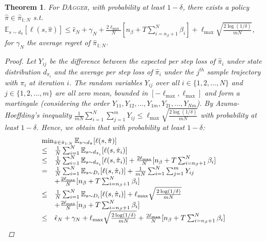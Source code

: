 \documentclass[twoside]{article}
\newtheorem{theorem}{Theorem}[section]
\begin{document}
\begin{theorem}
For \textsc{DAgger}, with probability at least $1-\delta$, there exists a policy $\hat{\pi} \in \hat{\pi}_{1:N}$ s.t. $\mathbb{E}_{s \sim d_{\hat{\pi}}}[ \ell(s,\hat{\pi}) ] \leq \hat{\epsilon}_N + \gamma_N + \frac{2 \ell_{\max}}{N} [n_\beta + T \sum_{i=n_\beta+1}^N \beta_i] + \ell_{\max} \sqrt{\frac{2\log(1/\delta)}{mN}}$, for $\gamma_N$ the average regret of $\hat{\pi}_{1:N}$.
\begin{proof}
Let $Y_{ij}$ be the difference between the expected per step loss of $\hat{\pi}_i$ under state distribution $d_{\pi_i}$ and the average per step loss of $\hat{\pi}_i$ under the $j^{th}$ sample trajectory with $\pi_i$ at iteration $i$. The random variables $Y_{ij}$ over all $i \in \{1,2,\dots,N\}$ and $j \in \{1,2,\dots,m\}$ are all zero mean, bounded in $[-\ell_{\max}, \ell_{\max}]$ and form a martingale (considering the order $Y_{11}, Y_{12}, \dots, Y_{1m}, Y_{21}, \dots, Y_{Nm}$). By Azuma-Hoeffding's inequality $\frac{1}{mN} \sum_{i=1}^N \sum_{j=1}^m Y_{ij} \leq \ell_{\max} \sqrt{\frac{2\log(1/\delta)}{mN}}$ with probability at least $1-\delta$. Hence, we obtain that with probability at least $1-\delta$:
\begin{displaymath}
\begin{array}{rl}
\multicolumn{2}{l}{\min_{\hat{\pi} \in \hat{\pi}_{1:N}} \mathbb{E}_{s \sim d_{\hat{\pi}}}[ \ell(s,\hat{\pi}) ]}\\
\leq & \frac{1}{N} \sum_{i=1}^N \mathbb{E}_{s \sim d_{\hat{\pi}_i}}[ \ell(s,\hat{\pi}_i) ]\\
\leq & \frac{1}{N} \sum_{i=1}^N \mathbb{E}_{s \sim d_{\pi_i}}[ \ell(s,\hat{\pi}_i) ] + \frac{2 \ell_{\max}}{N} [n_\beta + T \sum_{i=n_\beta+1}^N \beta_i] \\
= & \frac{1}{N} \sum_{i=1}^N \mathbb{E}_{s \sim D_i}[ \ell(s,\hat{\pi}_i) ] + \frac{1}{mN}\sum_{i=1}^N \sum_{j=1}^m Y_{ij} \\
& + \frac{2 \ell_{\max}}{N} [n_\beta + T \sum_{i=n_\beta+1}^N \beta_i]\\
\leq & \frac{1}{N} \sum_{i=1}^N \mathbb{E}_{s \sim D_i}[ \ell(s,\hat{\pi}_i) ] + \ell_{\max} \sqrt{\frac{2\log(1/\delta)}{mN}} \\
& + \frac{2 \ell_{\max}}{N} [n_\beta + T \sum_{i=n_\beta+1}^N \beta_i]\\
\leq & \hat{\epsilon}_N + \gamma_N + \ell_{\max} \sqrt{\frac{2\log(1/\delta)}{mN}} + \frac{2 \ell_{\max}}{N} [n_\beta + T \sum_{i=n_\beta+1}^N \beta_i] \\
\end{array}
\end{displaymath}
\end{proof}
\end{theorem}
\end{document}
